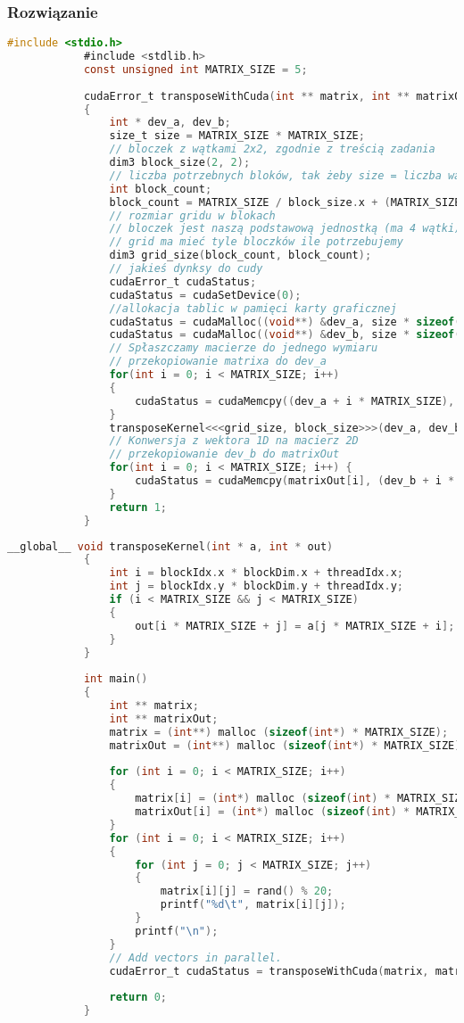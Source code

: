 		\subsubsection{Rozwiązanie}
			\begin{lstlisting}[language=C]
			#include <stdio.h>
			#include <stdlib.h>
			const unsigned int MATRIX_SIZE = 5;
			
			cudaError_t transposeWithCuda(int ** matrix, int ** matrixOut)
			{
				int * dev_a, dev_b;
				size_t size = MATRIX_SIZE * MATRIX_SIZE;
				// bloczek z wątkami 2x2, zgodnie z treścią zadania
				dim3 block_size(2, 2);
				// liczba potrzebnych bloków, tak żeby size = liczba wątków
				int block_count;
				block_count = MATRIX_SIZE / block_size.x + (MATRIX_SIZE % block_size.x == 0 ? 0 : 1);
				// rozmiar gridu w blokach
				// bloczek jest naszą podstawową jednostką (ma 4 wątki)
				// grid ma mieć tyle bloczków ile potrzebujemy
				dim3 grid_size(block_count, block_count);
				// jakieś dynksy do cudy
				cudaError_t cudaStatus;
				cudaStatus = cudaSetDevice(0);
				//allokacja tablic w pamięci karty graficznej
				cudaStatus = cudaMalloc((void**) &dev_a, size * sizeof(int));
				cudaStatus = cudaMalloc((void**) &dev_b, size * sizeof(int));
				// Spłaszczamy macierze do jednego wymiaru
				// przekopiowanie matrixa do dev_a
				for(int i = 0; i < MATRIX_SIZE; i++)
				{
					cudaStatus = cudaMemcpy((dev_a + i * MATRIX_SIZE), matrix[i], MATRIX_SIZE * sizeof(int), cudaMemcpyHostToDevice);
				}
				transposeKernel<<<grid_size, block_size>>>(dev_a, dev_b);
				// Konwersja z wektora 1D na macierz 2D
				// przekopiowanie dev_b do matrixOut
				for(int i = 0; i < MATRIX_SIZE; i++) {
					cudaStatus = cudaMemcpy(matrixOut[i], (dev_b + i * MATRIX_SIZE), MATRIX_SIZE * sizeof(int), cudaMemcpyDeviceToHost);
				}
				return 1;
			}
			\end{lstlisting}
			\newpage
			\begin{lstlisting}[language=C]
			__global__ void transposeKernel(int * a, int * out)
			{
				int i = blockIdx.x * blockDim.x + threadIdx.x;
				int j = blockIdx.y * blockDim.y + threadIdx.y;
				if (i < MATRIX_SIZE && j < MATRIX_SIZE)
				{
					out[i * MATRIX_SIZE + j] = a[j * MATRIX_SIZE + i];
				}
			}
			
			int main()
			{
				int ** matrix;
				int ** matrixOut;
				matrix = (int**) malloc (sizeof(int*) * MATRIX_SIZE);
				matrixOut = (int**) malloc (sizeof(int*) * MATRIX_SIZE);
				
				for (int i = 0; i < MATRIX_SIZE; i++)
				{
					matrix[i] = (int*) malloc (sizeof(int) * MATRIX_SIZE);
					matrixOut[i] = (int*) malloc (sizeof(int) * MATRIX_SIZE);
				}
				for (int i = 0; i < MATRIX_SIZE; i++)
				{
					for (int j = 0; j < MATRIX_SIZE; j++)
					{
						matrix[i][j] = rand() % 20;
						printf("%d\t", matrix[i][j]);
					}
					printf("\n");
				}
				// Add vectors in parallel.
				cudaError_t cudaStatus = transposeWithCuda(matrix, matrixOut);
				
				return 0;
			}
			
			\end{lstlisting}
		\newpage